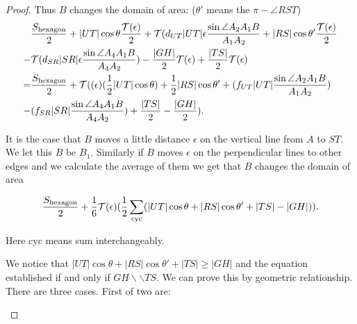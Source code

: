 \begin{proof}
	Thus $B$ changes the domain of area:
	($\theta'$ means the $\pi - \angle RST$)
	\begin{equation}
	\begin{split}
	&\frac{S_{\text{hexagon}}}{2} + |UT|\cos\theta \frac{\T(\epsilon)}{2} + \T(d_{UT}|UT|\epsilon\frac{\sin \angle A_2A_1B}{A_1A_2} + 
	|RS|\cos\theta' \frac{\T(\epsilon)}{2}\\
	-& \T(d_{SR}|SR|\epsilon\frac{\sin \angle A_4A_1B}{A_4A_2}) - \frac{|GH|}{2}\T(\epsilon) + 
	\frac{|TS|}{2}\T(\epsilon)
	\\
	= & \frac{S_{\text{hexagon}}}{2} + \T((\epsilon)
	(\frac{1}{2}|UT|\cos\theta )
	+\frac{1}{2}|RS|\cos\theta' +(f_{UT}|UT|\frac{\sin 
		\angle A_2A_1B}{A_1A_2})\\
	- &(f_{SR}|SR|\frac{\sin \angle A_4A_1B}{A_4A_2}) + 
	\frac{|TS|}{2} - \frac{|GH|}{2}).
	\end{split}
	\end{equation}
	
	It is the case that $B$ moves a little distance $\epsilon$ 
	on the vertical line from $A$ to $ST$. We let this $B$ be $B_1$. 
	Similarly if $B$ moves $\epsilon$ on the perpendicular lines to 
	other edges and we calculate the average of them we get that $B$ 
	changes the domain of area 
	
	\[ \frac{S_{\text{hexagon}}}{2} + \frac{1}{6} \T(\epsilon)(\frac{1}{2}\sum _{\text{cyc}}(|UT|\cos\theta+|RS|\cos\theta'+|TS|-|GH|)). \]
	
	Here cyc means sum interchangeably.
	
	We notice that $|UT|\cos\theta + |RS|\cos\theta' + |TS|\geq|GH|$ 
	and the equation established if and only if $GH \backslash \backslash TS$. 
	We can prove this by geometric relationship. There are three cases.
	First of two are:
	
	\begin{center}
		\begin{tikzpicture}[scale=0.6]
		

\end{tikzpicture}
\end{center}
\end{proof}
